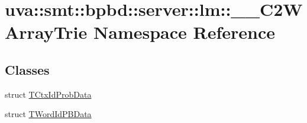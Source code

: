 \hypertarget{namespaceuva_1_1smt_1_1bpbd_1_1server_1_1lm_1_1_____c2_w_array_trie}{}\section{uva\+:\+:smt\+:\+:bpbd\+:\+:server\+:\+:lm\+:\+:\+\_\+\+\_\+\+C2\+W\+Array\+Trie Namespace Reference}
\label{namespaceuva_1_1smt_1_1bpbd_1_1server_1_1lm_1_1_____c2_w_array_trie}
\subsection*{Classes}
\begin{DoxyCompactItemize}
\item 
struct \hyperlink{structuva_1_1smt_1_1bpbd_1_1server_1_1lm_1_1_____c2_w_array_trie_1_1_t_ctx_id_prob_data}{T\+Ctx\+Id\+Prob\+Data}
\item 
struct \hyperlink{structuva_1_1smt_1_1bpbd_1_1server_1_1lm_1_1_____c2_w_array_trie_1_1_t_word_id_p_b_data}{T\+Word\+Id\+P\+B\+Data}
\end{DoxyCompactItemize}
